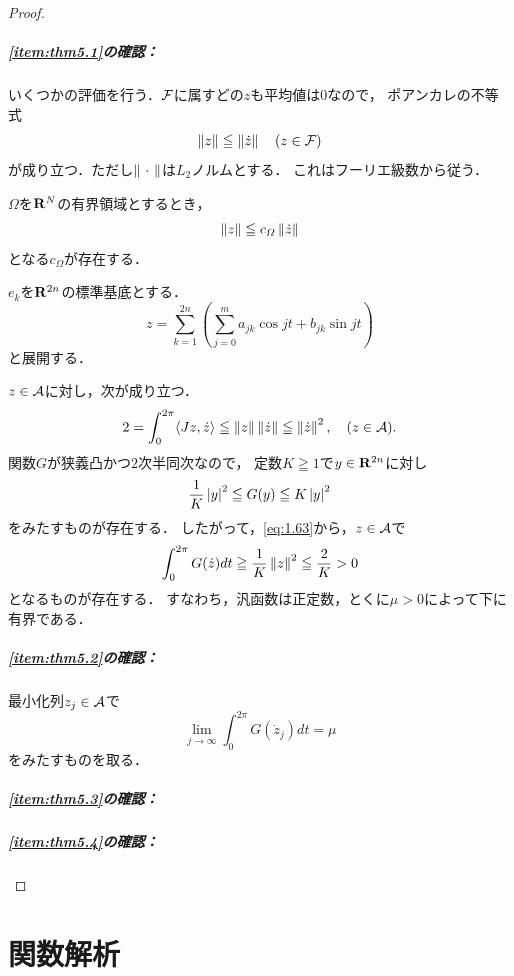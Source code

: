 \begin{proof}
    \subparagraph{\eqref{item:thm5.1}の確認：}
    いくつかの評価を行う．\(\cF\)に属すどの\(z\)も平均値は\(0\)なので，
    ポアンカレの不等式
    \[
        \norm[z]\leqq\norm[\dot{z}]\quad(z\in\cF)
    \]が成り立つ．ただし\(\norm[\blk]\)は\(L_2\)ノルムとする．
    これはフーリエ級数から従う．
    \begin{redleftbar}
        \begin{THM}
            \(\varOmega\)を\(\rr^{N}\)の有界領域とするとき，
            \[
                \norm[z]
                \leqq
                c_{\varOmega}\norm[\dot{z}]
            \]
            となる\(c_{\varOmega}\)が存在する．
        \end{THM}
        \(e_k\)を\(\rr^{2n}\)の標準基底とする．
        \[
            z=\sum_{k=1}^{2n}\left(
                \sum_{j=0}^{m} a_{jk}\cos{jt}+b_{jk}\sin{jt}
            \right)
        \]
        と展開する．
    \end{redleftbar}
    \(z\in\cA\)に対し，次が成り立つ．
    \begin{equation}\label{eq:1.63}
        2=\int_{0}^{2\pi}\inner<Jz,\dot{z}>
        \leqq
        \norm[z] 
        \norm[\dot{z}]
        \leqq
        \norm[\dot{z}]^2,\quad (z\in\cA).
    \end{equation}
    関数\(G\)が狭義凸かつ\(2\)次半同次なので，
    定数\(K\geqq1\)で\(y\in\rr^{2n}\)に対し\[
        \frac{1}{K}\abs[y]^2
        \leqq
        G(y)
        \leqq
        K\abs[y]^2
    \]をみたすものが存在する．
    したがって，\eqref{eq:1.63}から，\(z\in\cA\)で
    \begin{equation}\label{eq:1.64}
        \int_{0}^{2\pi}G(\dot{z})dt
        \geqq
        \frac{1}{K}\norm[z]^2
        \leqq
        \frac{2}{K}>0
    \end{equation}
    となるものが存在する．
    すなわち，汎函数は正定数，とくに\(\mu>0\)によって下に有界である．
    \subparagraph{\eqref{item:thm5.2}の確認：}
    最小化列\(z_j\in\cA\)で\begin{equation}\label{eq:1.65}
        \lim_{j\to\infty}\int_{0}^{2\pi}G(\dot{z}_j)dt=\mu
    \end{equation}をみたすものを取る．
    \subparagraph{\eqref{item:thm5.3}の確認：}
    \subparagraph{\eqref{item:thm5.4}の確認：}
\end{proof}

\section{関数解析}


